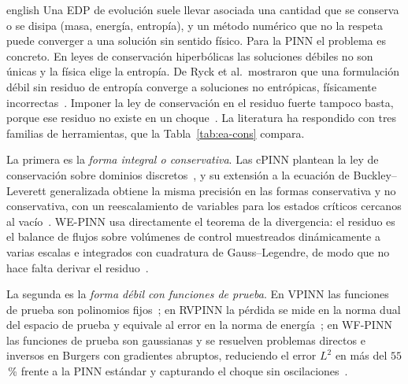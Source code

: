 \documentclass[../0000.tex]{subfiles}
\begin{document}
\begin{hyphenrules}{english}
Una EDP de evolución suele llevar asociada una cantidad que se conserva o se disipa (masa, energía, entropía), y un método numérico que no la respeta puede converger a una solución sin sentido físico. Para la PINN el problema es concreto. En leyes de conservación hiperbólicas las soluciones débiles no son únicas y la física elige la entropía. De Ryck et al.\ mostraron que una formulación débil sin residuo de entropía converge a soluciones no entrópicas, físicamente incorrectas~\cite{deryck2024wpinn}. Imponer la ley de conservación en el residuo fuerte tampoco basta, porque ese residuo no existe en un choque~\cite{chaumet2024improving}. La literatura ha respondido con tres familias de herramientas, que la Tabla~\ref{tab:ea-cons} compara.

La primera es la \emph{forma integral o conservativa}. Las cPINN plantean la ley de conservación sobre dominios discretos~\cite{jagtap2020conservative}, y su extensión a la ecuación de Buckley--Leverett generalizada obtiene la misma precisión en las formas conservativa y no conservativa, con un reescalamiento de variables para los estados críticos cercanos al vacío~\cite{quita2023conservative}. WE-PINN usa directamente el teorema de la divergencia: el residuo es el balance de flujos sobre volúmenes de control muestreados dinámicamente a varias escalas e integrados con cuadratura de Gauss--Legendre, de modo que no hace falta derivar el residuo~\cite{oubarka2026weak}.

La segunda es la \emph{forma débil con funciones de prueba}. En VPINN las funciones de prueba son polinomios fijos~\cite{kharazmi2019}; en RVPINN la pérdida se mide en la norma dual del espacio de prueba y equivale al error en la norma de energía~\cite{rojas2024robust}; en WF-PINN las funciones de prueba son gaussianas y se resuelven problemas directos e inversos en Burgers con gradientes abruptos, reduciendo el error $L^2$ en más del $55$\,\% frente a la PINN estándar y capturando el choque sin oscilaciones~\cite{wang2025wf}.


\end{hyphenrules}
\end{document}
